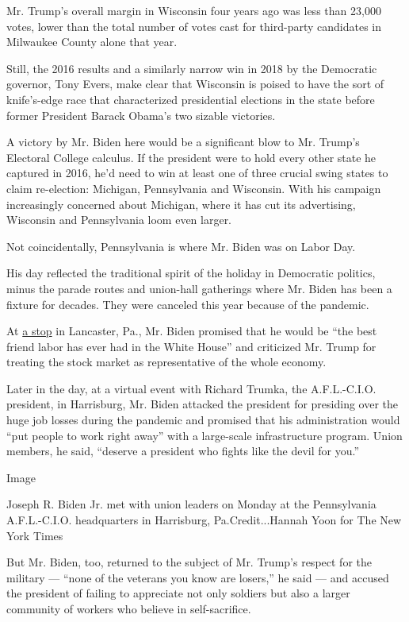 Mr. Trump's overall margin in Wisconsin four years ago was less than
23,000 votes, lower than the total number of votes cast for third-party
candidates in Milwaukee County alone that year.

Still, the 2016 results and a similarly narrow win in 2018 by the
Democratic governor, Tony Evers, make clear that Wisconsin is poised to
have the sort of knife's-edge race that characterized presidential
elections in the state before former President Barack Obama's two
sizable victories.

A victory by Mr. Biden here would be a significant blow to Mr. Trump's
Electoral College calculus. If the president were to hold every other
state he captured in 2016, he'd need to win at least one of three
crucial swing states to claim re-election: Michigan, Pennsylvania and
Wisconsin. With his campaign increasingly concerned about Michigan,
where it has cut its advertising, Wisconsin and Pennsylvania loom even
larger.

Not coincidentally, Pennsylvania is where Mr. Biden was on Labor Day.

His day reflected the traditional spirit of the holiday in Democratic
politics, minus the parade routes and union-hall gatherings where Mr.
Biden has been a fixture for decades. They were canceled this year
because of the pandemic.

At
\href{https://www.nytimes3xbfgragh.onion/live/2020/09/07/us/trump-vs-biden?action=click\&module=Top\%20Stories\&pgtype=Homepage\#biden-meets-with-union-workers-in-lancaster-pa}{a
stop} in Lancaster, Pa., Mr. Biden promised that he would be ``the best
friend labor has ever had in the White House'' and criticized Mr. Trump
for treating the stock market as representative of the whole economy.

Later in the day, at a virtual event with Richard Trumka, the
A.F.L.-C.I.O. president, in Harrisburg, Mr. Biden attacked the president
for presiding over the huge job losses during the pandemic and promised
that his administration would ``put people to work right away'' with a
large-scale infrastructure program. Union members, he said, ``deserve a
president who fights like the devil for you.''

Image

Joseph R. Biden Jr. met with union leaders on Monday at the Pennsylvania
A.F.L.-C.I.O. headquarters in Harrisburg, Pa.Credit...Hannah Yoon for
The New York Times

But Mr. Biden, too, returned to the subject of Mr. Trump's respect for
the military --- ``none of the veterans you know are losers,'' he said
--- and accused the president of failing to appreciate not only soldiers
but also a larger community of workers who believe in self-sacrifice.

